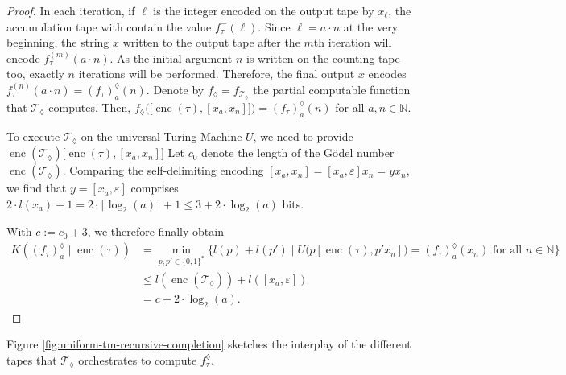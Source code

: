 \begin{proof}
	In each iteration, if $\ell$ is the integer encoded on the output tape by $x_\ell$, the accumulation tape with contain the value $f_{\tau}^{-}(\ell)$.
	Since $\ell=a\cdot n$ at the very beginning, the string $x$ written to the output tape after the $m$th iteration will encode $f_{\tau}^{(m)}(a\cdot n)$.
	As the initial argument $n$ is written on the counting tape too, exactly $n$ iterations will be performed.
	Therefore, the final output $x$ encodes $f_{\tau}^{(n)}(a\cdot n)=\left(f_{\tau}\right)_a^{\lozenge}(n)$. 
	Denote by $f_{\lozenge}=f_{\mathcal{T}_{\lozenge}}$ the partial computable function that $\mathcal{T}_{\lozenge}$ computes. Then, $f_{\lozenge}\bigl(\bigl[\operatorname{enc}(\tau),[x_a,x_n]\bigr]\bigr)=\left(f_{\tau}\right)_a^{\lozenge}(n)$ for all $a,n\in\mathbb{N}$.
	
	To execute $\mathcal{T}_{\lozenge}$ on the universal Turing Machine $U$,
	we need to provide $\operatorname{enc}(\mathcal{T}_{\lozenge})\bigl[\operatorname{enc}(\tau),[x_a,x_n]\bigr]$
	Let $c_0$ denote the length of the G\"odel number $\operatorname{enc}(\mathcal{T}_{\lozenge})$.
	Comparing the self-delimiting encoding $[x_a,x_n]=[x_a,\varepsilon]x_n=yx_n$, we find that $y=[x_a,\varepsilon]$ comprises $2\cdot l(x_a)+1 = 2\cdot \lceil \log_2(a)\rceil +1 \leq 3 + 2\cdot \log_2(a)$ bits.
	
	With $c:=c_0+3$, we therefore finally obtain
	\begin{align}
		K(\left(f_{\tau}\right)_{a}^{\lozenge}\mid \operatorname{enc}(\tau))
		&= \min_{p,p'\in\{0,1\}^{*}}\{l(p)+l(p')\mid U\bigl(p[\operatorname{enc}(\tau),p'x_n]\bigr)=\left(f_{\tau}\right)_{a}^{\lozenge}(x_n) \text{ for all } n\in\mathbb{N}\}\\
		& \leq l(\operatorname{enc}(\mathcal{T}_{\lozenge})) + l([x_a,\varepsilon])\\
		& = c + 2\cdot \log_2(a).
	\end{align}
\end{proof}
Figure \ref{fig:uniform-tm-recursive-completion} sketches the interplay of the different tapes that $\mathcal{T}_{\lozenge}$ orchestrates to compute $f_{\tau}^{\lozenge}$.
